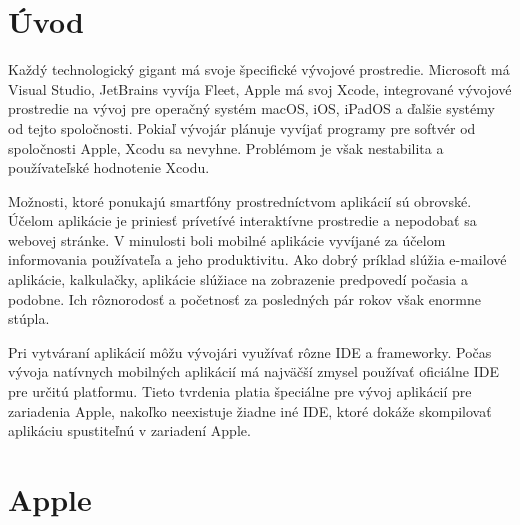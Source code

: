 \documentclass[12pt]{article}
\begin{document}
	\newpage
	
		\section{Úvod}
			Každý technologický gigant má svoje špecifické vývojové prostredie.  Microsoft má Visual Studio,  JetBrains vyvíja Fleet, Apple má svoj Xcode, integrované vývojové prostredie na vývoj pre operačný systém macOS, iOS, iPadOS a ďalšie systémy od tejto spoločnosti.  Pokiaľ vývojár plánuje vyvíjať programy pre softvér od spoločnosti Apple,  Xcodu sa nevyhne. Problémom je však nestabilita a používateľské hodnotenie Xcodu. \par
			Možnosti, ktoré ponukajú smartfóny prostredníctvom aplikácií sú obrovské. Účelom aplikácie je priniesť prívetívé interaktívne prostredie a nepodobať sa webovej stránke. V minulosti boli mobilné aplikácie vyvíjané za účelom informovania používateľa a jeho produktivitu. Ako dobrý príklad slúžia e-mailové aplikácie, kalkulačky, aplikácie slúžiace na zobrazenie predpovedí počasia a podobne. Ich rôznorodosť a početnosť za posledných pár rokov však enormne stúpla. \cite{vilcek} \par
			Pri vytváraní aplikácií môžu vývojári využívať rôzne IDE a frameworky. Počas vývoja natívnych mobilných aplikácií má najväčší zmysel používať oficiálne IDE pre určitú platformu. \cite{vilcek} Tieto tvrdenia platia špeciálne pre vývoj aplikácií pre zariadenia Apple, nakoľko neexistuje žiadne iné IDE, ktoré dokáže skompilovať aplikáciu spustiteľnú v zariadení Apple.\par

	\newpage
		\section{Apple}
\end{document}
